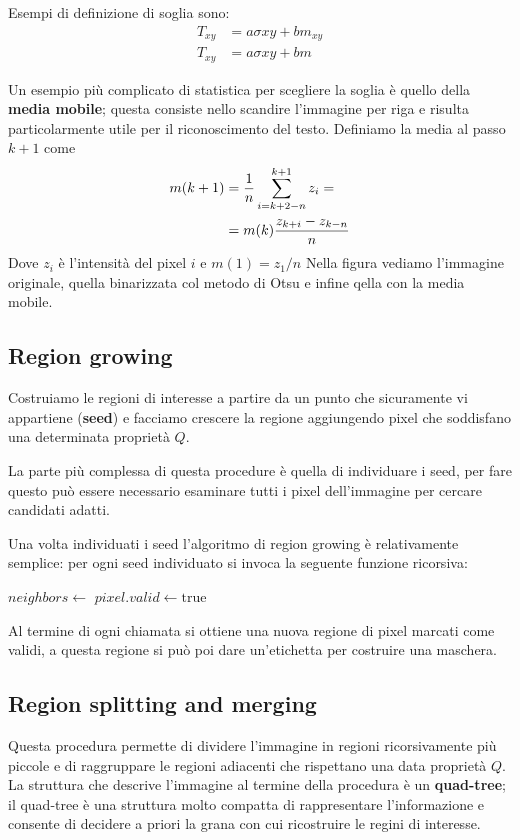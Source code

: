 Esempi di definizione di soglia sono:
\begin{align*}
	T_{xy} &= a\sigma{xy} +bm_{xy}\\
	T_{xy} &= a\sigma{xy}+bm
\end{align*}

Un esempio più complicato di statistica per scegliere la soglia è quello della \textbf{media mobile}; questa consiste nello scandire l'immagine per riga e risulta particolarmente utile per il riconoscimento del testo. Definiamo la media al passo $k+1$ come
\begin{align}
	m(k+1) &= \frac{1}{n}\sum_{i=k+2-n}^{k+1} z_i =\\ \notag
	               &=m(k)\frac{z_{k+i} - z_{k-n}}{n}
\end{align}
Dove $z_i$ è l'intensità del pixel $i$ e $m(1) = z_1 / n$
Nella figura vediamo l'immagine originale, quella binarizzata col metodo di Otsu e infine qella con la media mobile.

\subsection{Region growing}
Costruiamo le regioni di interesse a partire da un punto che sicuramente vi appartiene (\textbf{seed}) e facciamo crescere la regione aggiungendo pixel che soddisfano una determinata proprietà $Q$.

La parte più complessa di questa procedure è quella di individuare i seed, per fare questo può essere necessario esaminare tutti i pixel dell'immagine per cercare candidati adatti.

Una volta individuati i seed l'algoritmo di region growing è relativamente semplice: per ogni seed individuato si invoca la seguente funzione ricorsiva:
\vspace{.2cm}
\begin{algorithmic}
		\State $neighbors \gets $ 
				\State $pixel.valid \gets \text{true}$
				\State {} 
			\EndIf
		\EndFor
	\EndFunction    
\end{algorithmic}
\vspace{.2cm}
Al termine di ogni chiamata si ottiene una nuova regione di pixel marcati come validi, a questa regione si può poi dare un'etichetta per costruire una maschera.

\subsection{Region splitting and merging}
Questa procedura permette di dividere l'immagine in regioni ricorsivamente più piccole e di raggruppare le regioni adiacenti che rispettano una data proprietà $Q$. La struttura che descrive l'immagine al termine della procedura è un \textbf{quad-tree}; il quad-tree è una struttura molto compatta di rappresentare l'informazione e consente di decidere a priori la grana con cui ricostruire le regini di interesse.

